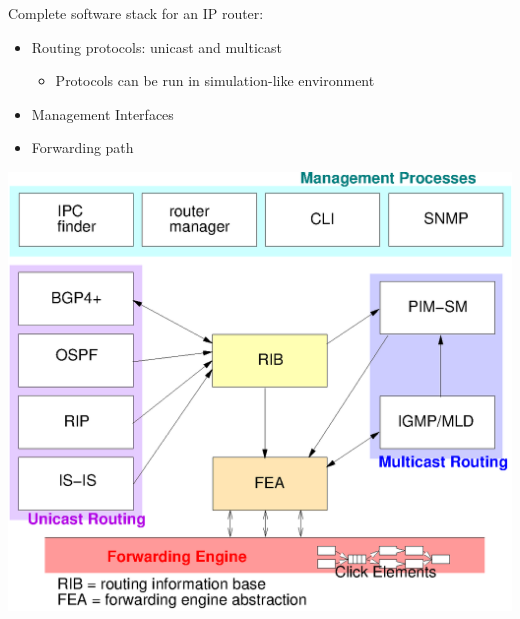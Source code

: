 \documentclass[landscape]{icsislides}
\begin{document}
\begin{slide}

Complete software stack for an IP router:

\begin{itemize}
  \item Routing protocols: unicast and multicast
  \begin{itemize}
    \item Protocols can be run in simulation-like environment
  \end{itemize}
  \item Management Interfaces
  \item Forwarding path
\end{itemize}

\end{slide}

\begin{slide}

\begin{center}
  \includegraphics[width=6.0in]{figs/xorp_arch}
\end{center}

\end{slide}
\end{document}
